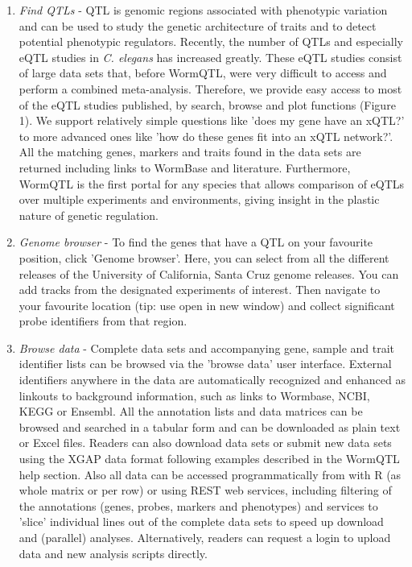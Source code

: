 \begin{enumerate}\itemsep1pt
\item \emph{Find QTLs} - QTL is genomic regions associated with phenotypic variation and can be 
used to study the genetic architecture of traits and to detect potential phenotypic regulators. 
Recently, the number of QTLs and especially eQTL studies in \emph{C. elegans} has increased greatly. 
These eQTL studies consist of large data sets that, before WormQTL, were very difficult to access 
and perform a combined meta-analysis. Therefore, we provide easy access to most of the eQTL studies 
published, by search, browse and plot functions (Figure 1). We support relatively simple questions like 
'does my gene have an xQTL?' to more advanced ones like 'how do these genes fit into an xQTL network?'. 
All the matching genes, markers and traits found in the data sets are returned including links to 
WormBase and literature. Furthermore, WormQTL is the first portal for any species that allows comparison 
of eQTLs over multiple experiments and environments, giving insight in the plastic nature of genetic 
regulation.
\item \emph{Genome browser} - To find the genes that have a QTL on your favourite position, click 
'Genome browser'. Here, you can select from all the different releases of the University of California, 
Santa Cruz genome releases. You can add tracks from the designated experiments of interest. Then 
navigate to your favourite location (tip: use open in new window) and collect significant probe 
identifiers from that region.
\item \emph{Browse data} - Complete data sets and accompanying gene, sample and trait identifier 
lists can be browsed via the 'browse data' user interface. External identifiers anywhere in the 
data are automatically recognized and enhanced as linkouts to background information, such as links 
to Wormbase, NCBI, KEGG or Ensembl. All the annotation lists and data matrices can be browsed and 
searched in a tabular form and can be downloaded as plain text or Excel files. Readers can also 
download data sets or submit new data sets using the XGAP data format following examples described 
in the WormQTL help section. Also all data can be accessed programmatically from with R (as whole 
matrix or per row) or using REST web services, including filtering of the annotations (genes, probes, 
markers and phenotypes) and services to 'slice' individual lines out of the complete data sets to 
speed up download and (parallel) analyses. Alternatively, readers can request a login to upload 
data and new analysis scripts directly.
\end{enumerate}

